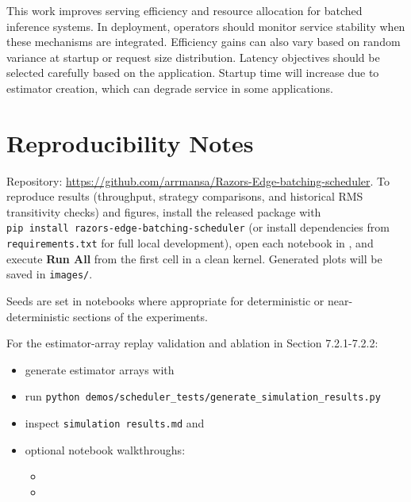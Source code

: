 \documentclass{article}
\providecommand{\tightlist}{\setlength{\itemsep}{0pt}\setlength{\parskip}{0pt}}
\begin{document}
This work improves serving efficiency and resource allocation for
batched inference systems. In deployment, operators should monitor
service stability when these mechanisms are integrated. Efficiency gains
can also vary based on random variance at startup or request size
distribution. Latency objectives should be selected carefully based on
the application. Startup time will increase due to estimator creation,
which can degrade service in some applications.

\hypertarget{12-reproducibility-notes}{%
\section{Reproducibility Notes}\label{12-reproducibility-notes}}

Repository:
\url{https://github.com/arrmansa/Razors-Edge-batching-scheduler}. To
reproduce results (throughput, strategy comparisons, and historical RMS
transitivity checks) and figures, install the released package with
\texttt{pip\ install\ razors-edge-batching-scheduler} (or install
dependencies from \texttt{requirements.txt} for full local development),
open each notebook in , and execute \textbf{Run All} from
the first cell in a clean kernel. Generated plots will be saved in
\texttt{images/}.

Seeds are set in notebooks where appropriate for deterministic or
near-deterministic sections of the experiments.

For the estimator-array replay validation and ablation in Section
7.2.1-7.2.2:

\begin{itemize}
\tightlist
\item
  generate estimator arrays with
\item
  run
  \texttt{python\ demos/scheduler\_tests/generate\_simulation\_results.py}
\item
  inspect \texttt{simulation\ results.md} and
\item
  optional notebook walkthroughs:

  \begin{itemize}
  \tightlist
  \item
  \item
  \end{itemize}
\end{itemize}
\end{document}

